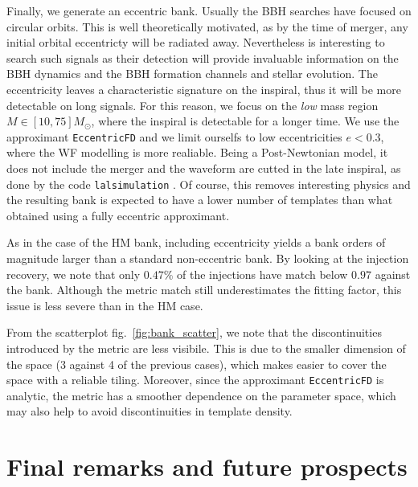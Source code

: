 \documentclass[twocolumn,showpacs,preprintnumbers,nofootinbib,prd,
superscriptaddress,10pt]{revtex4-2}
\begin{document}
Finally, we generate an eccentric bank. Usually the BBH searches have focused on circular orbits.
This is well theoretically motivated, as by the time of merger, any initial orbital eccentricty will be radiated away. Nevertheless is interesting to search such signals as their detection will provide invaluable information on the BBH dynamics and the BBH formation channels and stellar evolution.
The eccentricity leaves a characteristic signature on the inspiral, thus it will be more detectable on long signals. For this reason, we focus on the {\it low} mass region $M\in [10,75] M_\odot$, where the inspiral is detectable for a longer time.
We use the approximant \texttt{EccentricFD} \cite{PhysRevD.93.124061} and we limit ourselfs to low eccentricities $e<0.3$, where the WF modelling is more realiable. Being a Post-Newtonian model, it does not include the merger and the waveform are cutted in the late inspiral, as done by the code \texttt{lalsimulation} \cite{lalsuite}. Of course, this removes interesting physics and the resulting bank is expected to have a lower number of templates than what obtained using a fully eccentric approximant.

As in the case of the HM bank, including eccentricity yields a bank orders of magnitude larger than a standard non-eccentric bank.
By looking at the injection recovery, we note that only $0.47\%$ of the injections have match below $0.97$ against the bank. Although the metric match still underestimates the fitting factor, this issue is less severe than in the HM case.

From the scatterplot fig.~\ref{fig:bank_scatter}, we note that the discontinuities introduced by the metric are less visibile. This is due to the smaller dimension of the space (3 against 4 of the previous cases), which makes easier to cover the space with a reliable tiling. Moreover, since the approximant \texttt{EccentricFD} is analytic, the metric has a smoother dependence on the parameter space, which may also help to avoid discontinuities in template density.

\section{Final remarks and future prospects} \label{sec:conclusion}
\end{document}
